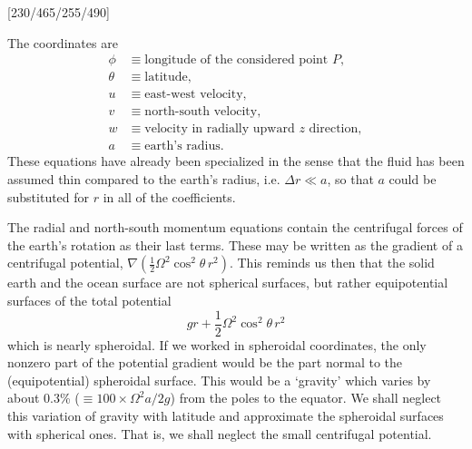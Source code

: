 [230/465/255/490]

The coordinates are
\begin{align*}
	\phi   & \equiv \text{longitude of the considered point }P,            \\
	\theta & \equiv \text{latitude},                                       \\
	u      & \equiv \text{east-west velocity},                             \\
	v      & \equiv \text{north-south velocity},                           \\
	w      & \equiv \text{velocity in radially upward }z\text{ direction}, \\
	a      & \equiv \text{earth's radius}.
\end{align*}
These equations have already been specialized in the sense that the fluid has been
assumed thin compared to the earth's radius, i.e. $\Delta r\ll a$, so that $a$ could be
substituted for $r$ in all of the coefficients.

\sourcepagebreak

The radial and north-south momentum equations contain the centrifugal forces
of the earth's rotation as their last terms. These may be written as the gradient of a
centrifugal potential, $\nabla(\tfrac12\Omega^2\cos^2\theta\,r^2)$. This reminds us then that the solid earth and
the ocean surface are not spherical surfaces, but rather equipotential surfaces of the
total potential
\[
	gr+\frac12\Omega^2\cos^2\theta\,r^2
\]
which is nearly spheroidal. If we worked in spheroidal coordinates, the only nonzero
part of the potential gradient would be the part normal to the (equipotential)
spheroidal surface. This would be a `gravity' which varies by about 0.3\%
($\equiv100\times\Omega^2a/2g$) from the poles to the equator. We shall neglect this variation of
gravity with latitude and approximate the spheroidal surfaces with spherical ones.
That is, we shall neglect the small centrifugal potential.

